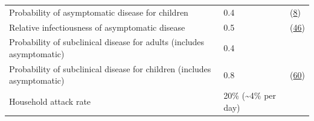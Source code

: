 \documentclass[
]{article}
\begin{document}
\begin{longtable}[]{@{}lll@{}}
\begin{minipage}[t]{0.28\columnwidth}\raggedright
Probability of asymptomatic disease for children\strut
\end{minipage} & \begin{minipage}[t]{0.09\columnwidth}\raggedright
0.4\strut
\end{minipage} & \begin{minipage}[t]{0.54\columnwidth}\raggedright
(\protect\hyperlink{ref-fontanet_sars-cov-2_2020}{8})\strut
\end{minipage}\tabularnewline
\begin{minipage}[t]{0.28\columnwidth}\raggedright
Relative infectiousness of asymptomatic disease\strut
\end{minipage} & \begin{minipage}[t]{0.09\columnwidth}\raggedright
0.5\strut
\end{minipage} & \begin{minipage}[t]{0.54\columnwidth}\raggedright
(\protect\hyperlink{ref-byambasuren_estimating_2020}{46})\strut
\end{minipage}\tabularnewline
\begin{minipage}[t]{0.28\columnwidth}\raggedright
Probability of subclinical disease for adults (includes
asymptomatic)\strut
\end{minipage} & \begin{minipage}[t]{0.09\columnwidth}\raggedright
0.4\strut
\end{minipage} & \begin{minipage}[t]{0.54\columnwidth}\raggedright
\strut
\end{minipage}\tabularnewline
\begin{minipage}[t]{0.28\columnwidth}\raggedright
Probability of subclinical disease for children (includes
asymptomatic)\strut
\end{minipage} & \begin{minipage}[t]{0.09\columnwidth}\raggedright
0.8\strut
\end{minipage} & \begin{minipage}[t]{0.54\columnwidth}\raggedright
(\protect\hyperlink{ref-han_clinical_2020}{60})\strut
\end{minipage}\tabularnewline
\begin{minipage}[t]{0.28\columnwidth}\raggedright
Household attack rate\strut
\end{minipage} & \begin{minipage}[t]{0.09\columnwidth}\raggedright
20\% (\textasciitilde4\% per day)\strut

\end{minipage}
\end{longtable}
\end{document}
